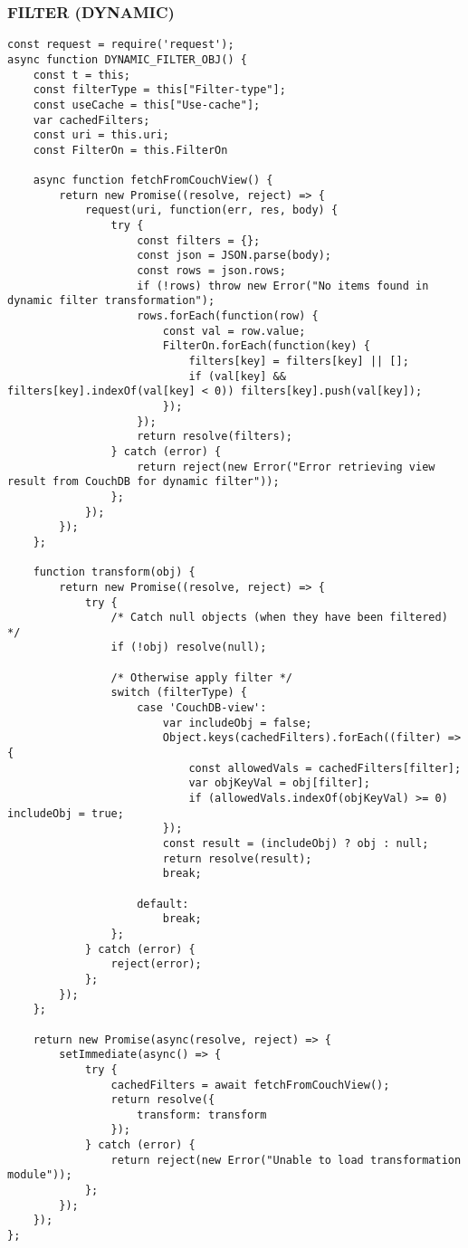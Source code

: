 \subsubsection{FILTER (DYNAMIC)}
\label{netl-trans-filter-obj-dynamic}
\begin{verbatim}
const request = require('request');
async function DYNAMIC_FILTER_OBJ() {
    const t = this;
    const filterType = this["Filter-type"];
    const useCache = this["Use-cache"];
    var cachedFilters;
    const uri = this.uri;
    const FilterOn = this.FilterOn

    async function fetchFromCouchView() {
        return new Promise((resolve, reject) => {
            request(uri, function(err, res, body) {
                try {
                    const filters = {};
                    const json = JSON.parse(body);
                    const rows = json.rows;
                    if (!rows) throw new Error("No items found in dynamic filter transformation");
                    rows.forEach(function(row) {
                        const val = row.value;
                        FilterOn.forEach(function(key) {
                            filters[key] = filters[key] || [];
                            if (val[key] && filters[key].indexOf(val[key] < 0)) filters[key].push(val[key]);
                        });
                    });
                    return resolve(filters);
                } catch (error) {
                    return reject(new Error("Error retrieving view result from CouchDB for dynamic filter"));
                };
            });
        });
    };

    function transform(obj) {
        return new Promise((resolve, reject) => {
            try {
                /* Catch null objects (when they have been filtered) */
                if (!obj) resolve(null);

                /* Otherwise apply filter */
                switch (filterType) {
                    case 'CouchDB-view':
                        var includeObj = false;
                        Object.keys(cachedFilters).forEach((filter) => {
                            const allowedVals = cachedFilters[filter];
                            var objKeyVal = obj[filter];
                            if (allowedVals.indexOf(objKeyVal) >= 0) includeObj = true;
                        });
                        const result = (includeObj) ? obj : null;
                        return resolve(result);
                        break;

                    default:
                        break;
                };
            } catch (error) {
                reject(error);
            };
        });
    };

    return new Promise(async(resolve, reject) => {
        setImmediate(async() => {
            try {
                cachedFilters = await fetchFromCouchView();
                return resolve({
                    transform: transform
                });
            } catch (error) {
                return reject(new Error("Unable to load transformation module"));
            };
        });
    });
};
\end{verbatim}

